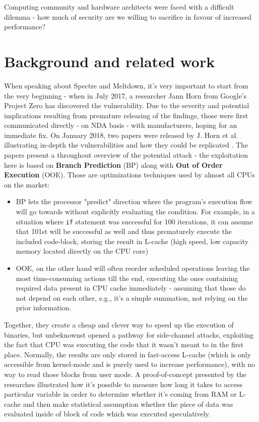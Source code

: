 \documentclass{csfourzero}
\begin{document}
Computing community and hardware architects were faced with a difficult dilemma - how much of security are we willing to sacrifice in favour of increased performance?

\section{Background and related work}
\label{sec:lit}

When speaking about Spectre and Meltdown, it's very important to start from the very beginning - when in July 2017, a researcher Jann Horn from Google's Project Zero has discovered the vulnerability. Due to the severity and potential implications resulting from premature releasing of the findings, those were first communicated directly - on NDA basis - with manufacturers, hoping for an immediate fix. On January 2018, two papers were released by J. Horn et al. illustrating in-depth the vulnerabilities and how they could be replicated \cite{Lipp2018meltdown, Kocher2018spectre}. The papers present a throughout overview of the potential attack - the exploitation here is based on \textbf{Branch Prediction} (BP) along with \textbf{Out of Order Execution} (OOE). Those are optimizations techniques used by almost all CPUs on the market:

\begin{itemize}[noitemsep]
  \item BP lets the processor "predict" direction where the program's execution flow will go towards without explicitly evaluating the condition. For example, in a situation where \lstinline{if} statement was successful for 100 iterations, it can assume that 101st will be successful as well and thus prematurely execute the included code-block, storing the result in L-cache (high speed, low capacity memory located directly on the CPU core)  
  \item OOE, on the other hand will often reorder scheduled operations leaving the most time-consuming actions till the end, executing the ones containing required data present in CPU cache immediately - assuming that those do not depend on each other, e.g., it's a simple summation, not relying on the prior information.
\end{itemize}

Together, they create a cheap and clever way to speed up the execution of binaries, but unbeknownst opened a pathway for side-channel attacks, exploiting the fact that CPU was executing the code that it wasn't meant to in the first place. Normally, the results are only stored in fast-access L-cache (which is only accessible from kernel-mode and is purely used to increase performance), with no way to read those blocks from user mode. A proof-of-concept presented by the researches \cite{Kocher2018spectre} illustrated how it's possible to measure how long it takes to access particular variable in order to determine whether it's coming from RAM or L-cache and then make statistical assumption whether the piece of data was evaluated inside of block of code which was executed speculatively. 
\end{document}
